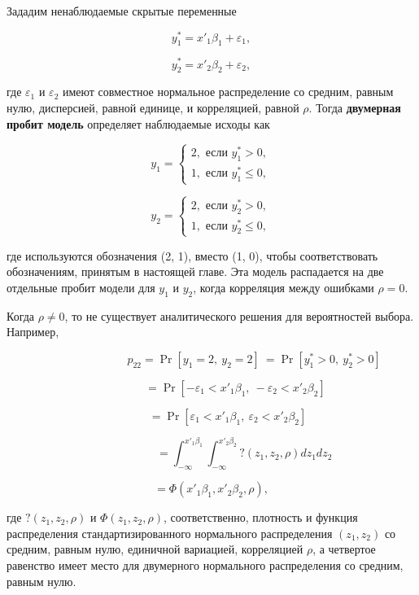 Зададим ненаблюдаемые скрытые переменные

\begin{equation} \label{GrindEQ__15_51_} y^*_1=x'_1{\beta }_1+{\varepsilon }_1, \end{equation} 

\[y^*_2=x'_2{\beta }_2+{\varepsilon }_2,\] 

где ${\varepsilon }_1$ и ${\varepsilon }_2$ имеют совместное нормальное распределение со средним, равным нулю, дисперсией, равной единице, и корреляцией, равной $\rho $. Тогда \textbf{двумерная пробит модель }определяет наблюдаемые исходы как

\[y_1=\left\{ \begin{array}{c}
2,\text{ если } y^*_1>0, \\ 
1,\text{ если } y^*_1\le 0, \end{array}
\right.\] 

\[y_2=\left\{ \begin{array}{c}
2,\text{ если } y^*_2>0, \\ 
1,\text{ если } y^*_2\le 0, \end{array}
\right.\] 

где используются обозначения (2, 1), вместо (1, 0), чтобы соответствовать обозначениям, принятым в настоящей главе. Эта модель распадается на две отдельные пробит модели для $y_1$ и $y_2$, когда корреляция между ошибками $\rho =0$.

Когда $\rho \ne 0$, то не существует аналитического решения для вероятностей выбора. Например,

\[{\ \ \ \ \ \ \ \ \ \ \ \ \ \ \ \ \ \ \ \ \ \ \ \ \ \ \ \ \ \ \ \ \ \ \ p}_{22}={\Pr  \left[y_1=2,\ y_2=2\right]\ }={\Pr  \left[y^*_1>0,\ y^*_2>0\right]\ }\] 

\[\ \ \ \ \ \ \ \ \ \ \ \ \ \ \ \ \ \ \ \ ={\Pr  \left[-{\varepsilon }_1<x'_1{\beta }_1,\ -{\varepsilon }_2<x'_2{\beta }_2\right]\ }\] 

\[\ \ \ \ \ \ \ \ \ \ \ \ \ \ ={\Pr  \left[{\varepsilon }_1<x'_1{\beta }_1,\ {\varepsilon }_2<x'_2{\beta }_2\right]\ }\] 

\[\ \ \ \ \ \ \ \ \ \ \ \ \ \ \ \ \ \ \ \ \ \ \ \ \ \ =\int^{x'_1{\beta }_1}_{-\infty }{\int^{x'_2{\beta }_2}_{-\infty }{?\left(z_1,z_2,\rho \right)dz_1dz_2}}\] 

\[=\Phi \left(x'_1{\beta }_1,x'_2{\beta }_2,\rho \right),\] 

где $?\left(z_1,z_2,\rho \right)$ и $\Phi \left(z_1,z_2,\rho \right)$, соответственно, плотность и функция распределения стандартизированного нормального распределения $(z_1,z_2)$ со средним, равным нулю, единичной вариацией, корреляцией $\rho $, а четвертое равенство имеет место для двумерного нормального распределения со средним, равным нулю.

